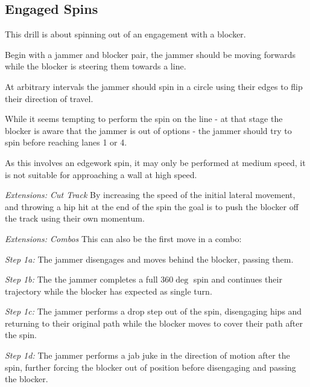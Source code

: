 \subsection{Engaged Spins}
\label{drill:jammer_movement/momentum_jukes/engaged_spins}

This drill is about spinning out of an engagement with a blocker.


Begin with a jammer and blocker pair, the jammer should be moving forwards while the blocker is steering them towards a line.

At arbitrary intervals the jammer should spin in a circle using their edges to flip their direction of travel. 

While it seems tempting to perform the spin on the line - at that stage the blocker is aware that the jammer is out of options - the jammer should try to spin before reaching lanes 1 or 4.     

As this involves an edgework spin, it may only be performed at medium speed, it is not suitable for approaching a wall at high speed.

\vspace{0.15cm}


{\it Extensions: Cut Track}
By increasing the speed of the initial lateral movement, and throwing a hip hit at the end of the spin the goal is to push the blocker off the track using their own momentum.


\vspace{0.15cm}

{\it Extensions: Combos}
This can also be the first move in a combo:

{\it Step 1a: }
The jammer disengages and moves behind the blocker, passing them.


{\it Step 1b: }
The the jammer completes a full $360\deg$ spin and continues their trajectory while the blocker has expected as single turn. 


{\it Step 1c: }
The jammer performs a drop step out of the spin, disengaging hips and returning to their original path while the blocker moves to cover their path after the spin.


{\it Step 1d: }
The jammer performs a jab juke in the direction of motion after the spin, further forcing the blocker out of position before disengaging and passing the blocker. 

